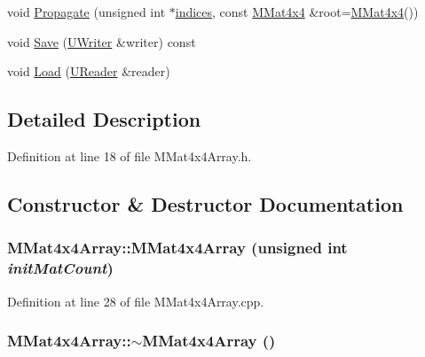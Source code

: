 \begin{CompactItemize}
\item 
void \hyperlink{class_m_mat4x4_array_91a049d047232f4298c645ded9e46142}{Propagate} (unsigned int $\ast$\hyperlink{glext__bak_8h_c4293d0f76770fe857be3431df25308d}{indices}, const \hyperlink{class_m_mat4x4}{MMat4x4} \&root=\hyperlink{class_m_mat4x4}{MMat4x4}())
\item 
void \hyperlink{class_m_mat4x4_array_1f3e7923d51eed94d4d674ba5cc7df7e}{Save} (\hyperlink{class_u_writer}{UWriter} \&writer) const 
\item 
void \hyperlink{class_m_mat4x4_array_4eb1ad1a6c4090608003253c88aa9892}{Load} (\hyperlink{class_u_reader}{UReader} \&reader)
\end{CompactItemize}


\subsection{Detailed Description}


Definition at line 18 of file MMat4x4Array.h.

\subsection{Constructor \& Destructor Documentation}
\hypertarget{class_m_mat4x4_array_d5f55fe80bba0ebd9f0183fb7b5e1f1b}{
\subsubsection[{MMat4x4Array}]{\setlength{\rightskip}{0pt plus 5cm}MMat4x4Array::MMat4x4Array (unsigned int {\em initMatCount})}}
\label{class_m_mat4x4_array_d5f55fe80bba0ebd9f0183fb7b5e1f1b}




Definition at line 28 of file MMat4x4Array.cpp.\hypertarget{class_m_mat4x4_array_17b7e79c2363b5d1e8dbb8fba2273c49}{
\subsubsection[{$\sim$MMat4x4Array}]{\setlength{\rightskip}{0pt plus 5cm}MMat4x4Array::$\sim$MMat4x4Array ()}}
\label{class_m_mat4x4_array_17b7e79c2363b5d1e8dbb8fba2273c49}




